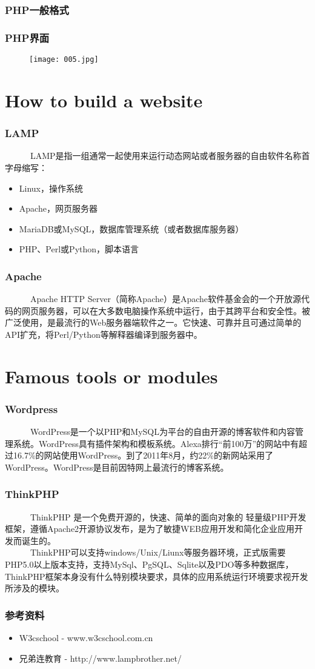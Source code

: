 \documentclass[notheorems,mathserif,table,compress]{beamer}  %
\begin{document}
\begin{frame}
\frametitle{PHP一般格式}
 	
\end{frame}
 \begin{frame}
 \frametitle{PHP界面}
 	\begin{figure}[!ht]
	\centering\texttt{[image: 005.jpg]}
	\end{figure}
\end{frame}

\section{How to build a website}
\begin{frame}
 \frametitle{LAMP}
~~~~~~LAMP是指一组通常一起使用来运行动态网站或者服务器的自由软件名称首字母缩写：
	\begin{itemize}
 	\item Linux，操作系统
 	\item Apache，网页服务器
	\item MariaDB或MySQL，数据库管理系统（或者数据库服务器）
	\item PHP、Perl或Python，脚本语言
 	\end{itemize}
\end{frame}
\begin{frame}
 \frametitle{Apache}
 ~~~~~~Apache HTTP Server（简称Apache）是Apache软件基金会的一个开放源代码的网页服务器，可以在大多数电脑操作系统中运行，由于其跨平台和安全性。被广泛使用，是最流行的Web服务器端软件之一。它快速、可靠并且可通过简单的API扩充，将Perl/Python等解释器编译到服务器中。\end{frame}

\section{Famous tools or modules}
\begin{frame}
 \frametitle{Wordpress}
 ~~~~~~WordPress是一个以PHP和MySQL为平台的自由开源的博客软件和内容管理系统。WordPress具有插件架构和模板系统。Alexa排行“前100万”的网站中有超过16.7\%的网站使用WordPress。到了2011年8月，约22\%的新网站采用了WordPress。WordPress是目前因特网上最流行的博客系统。
\end{frame}
\begin{frame}
 \frametitle{ThinkPHP}
~~~~~~ThinkPHP 是一个免费开源的，快速、简单的面向对象的 轻量级PHP开发框架，遵循Apache2开源协议发布，是为了敏捷WEB应用开发和简化企业应用开发而诞生的。\\
~~~~~~ThinkPHP可以支持windows/Unix/Liunx等服务器环境，正式版需要PHP5.0以上版本支持，支持MySql、PgSQL、Sqlite以及PDO等多种数据库，ThinkPHP框架本身没有什么特别模块要求，具体的应用系统运行环境要求视开发所涉及的模块。
\end{frame}
\begin{frame}
 \frametitle{参考资料}
 	\begin{itemize}
 	\item W3cschool - www.w3cschool.com.cn
 	\item 兄弟连教育 - http://www.lampbrother.net/
 	\end{itemize}
\end{frame}
\end{document}
